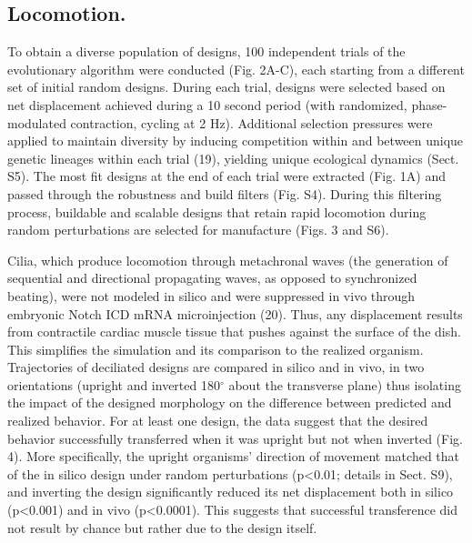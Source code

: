 \subsection*{Locomotion.}  

To obtain a diverse population of designs, 100 independent trials of the evolutionary algorithm were conducted (Fig. 2A-C), each starting from a different set of initial random designs. During each trial, designs were selected based on net displacement achieved during a 10 second period (with randomized, phase-modulated contraction, cycling at 2 Hz). Additional selection pressures were applied to maintain diversity by inducing competition within and between unique genetic lineages within each trial (19), yielding unique ecological dynamics (Sect. S5). The most fit designs at the end of each trial were extracted (Fig. 1A) and passed through the robustness and build filters (Fig. S4). During this filtering process, buildable and scalable designs that retain rapid locomotion during random perturbations are selected for manufacture (Figs. 3 and S6). 

Cilia, which produce locomotion through metachronal waves (the generation of sequential and directional propagating waves, as opposed to synchronized beating), were not modeled in silico and were suppressed in vivo through embryonic Notch ICD mRNA microinjection (20). Thus, any displacement results from contractile cardiac muscle tissue that pushes against the surface of the dish. This simplifies the simulation and its comparison to the realized organism. Trajectories of deciliated designs are compared in silico and in vivo, in two orientations (upright and inverted 180{$^{\circ}$} about the transverse plane) thus isolating the impact of the designed morphology on the difference between predicted and realized behavior. For at least one design, the data suggest that the desired behavior successfully transferred when it was upright but not when inverted (Fig. 4). More specifically, the upright organisms' direction of movement matched that of the in silico design under random perturbations (p<0.01; details in Sect. S9), and inverting the design significantly reduced its net displacement both in silico (p<0.001) and in vivo (p<0.0001). This suggests that successful transference did not result by chance but rather due to the design itself. 



